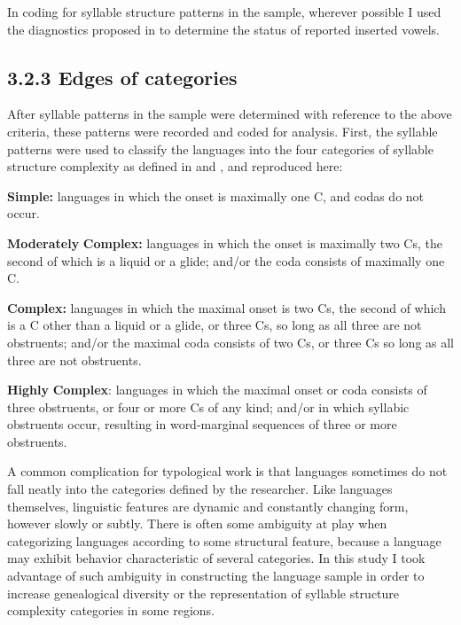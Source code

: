   In coding for syllable structure patterns in the sample, wherever possible I used the diagnostics proposed in \citet{Hall2006} to determine the status of reported inserted vowels.

\subsection{3.2.3 Edges of categories}

  After syllable patterns in the sample were determined with reference to the above criteria, these patterns were recorded and coded for analysis. First, the syllable patterns were used to classify the languages into the four categories of syllable structure complexity as defined in \citet{Maddieson2013a} and , and reproduced here:

\textbf{Simple:} languages in which the onset is maximally one C, and codas do not occur.

\textbf{Moderately} \textbf{Complex:} languages in which the onset is maximally two Cs, the second of which is a liquid or a glide; and/or the coda consists of maximally one C.

\textbf{Complex:} languages in which the maximal onset is two Cs, the second of which is a C other than a liquid or a glide, or three Cs, so long as all three are not obstruents; and/or the maximal coda consists of two Cs, or three Cs so long as all three are not obstruents.

\textbf{Highly} \textbf{Complex}: languages in which the maximal onset or coda consists of three obstruents, or four or more Cs of any kind; and/or in which syllabic obstruents occur, resulting in word-marginal sequences of three or more obstruents.

  A common complication for typological work is that languages sometimes do not fall neatly into the categories defined by the researcher. Like languages themselves, linguistic features are dynamic and constantly changing form, however slowly or subtly. There is often some ambiguity at play when categorizing languages according to some structural feature, because a language may exhibit behavior characteristic of several categories. In this study I took advantage of such ambiguity in constructing the language sample in order to increase genealogical diversity or the representation of syllable structure complexity categories in some regions.


